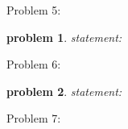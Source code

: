 \documentclass[10pt]{article}
\newtheorem{problem}{\sc\color{cit}problem}
\begin{document}
\begin{solution} Problem 5:

\end{solution}
\vspace{2cm}


\begin{problem} statement:

\end{problem}

\begin{solution} Problem 6:

\end{solution}
\vspace{2cm}


\begin{problem} statement:

\end{problem}

\begin{solution} Problem 7:

\end{solution}
\end{document}
